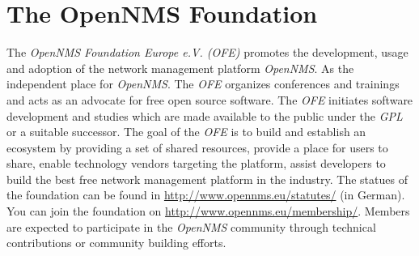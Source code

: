 \section{The OpenNMS Foundation}
The \emph{OpenNMS Foundation Europe e.V. (OFE)} promotes the development, usage and adoption of the network management platform \emph{OpenNMS}. As the independent place for \emph{OpenNMS}. The \emph{OFE} organizes conferences and trainings and acts as an advocate for free open source software. The \emph{OFE} initiates software development and studies which are made available to the public under the \emph{GPL} or a suitable successor. The goal of the \emph{OFE} is to build and establish an ecosystem by providing a set of shared resources, provide a place for users to share, enable technology vendors targeting the platform, assist developers to build the best free network management platform in the industry. The statues of the foundation can be found in \url{http://www.opennms.eu/statutes/} (in German). You can join the foundation on \url{http://www.opennms.eu/membership/}. Members are expected to participate in the \emph{OpenNMS} community through technical contributions or community building efforts.